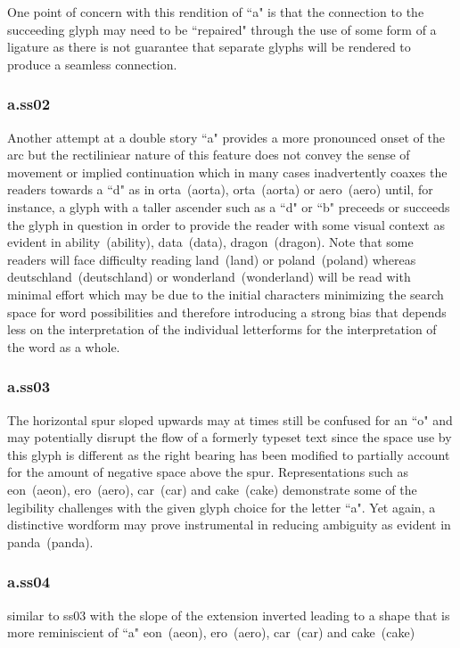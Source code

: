 One point of concern with this rendition of ``a" is that the connection to the
succeeding glyph may need to be ``repaired" through the use of some form of a
ligature as there is not guarantee that separate glyphs will be rendered to
produce a seamless connection.

\subsubsection{{\sstwo a}.ss02}

Another attempt at a double story ``a" provides a more pronounced onset of
the arc but the rectiliniear nature of this feature does not convey the sense
of movement or implied continuation which in many cases inadvertently coaxes
the readers towards a ``d" as in
\mbox{{orta} (aorta)},
\mbox{{ort{\sstwo a}} (aorta)} or
\mbox{{\sstwo aero} (aero)}
until, for instance, a glyph with a taller ascender such as a ``d" or ``b"
preceeds or succeeds the glyph in question in order to provide the reader with
some visual context as evident in
\mbox{{\sstwo ability} (ability)},
\mbox{{\sstwo data} (data)},
\mbox{{\sstwo dragon} (dragon)}. Note that some readers will face
difficulty reading \mbox{{\sstwo land} (land)} or
\mbox{{\sstwo poland} (poland)} whereas \mbox{{\sstwo deutschland} (deutschland)} or
\mbox{{\sstwo wonderland} (wonderland)}
will be read with minimal effort which may be due to the initial
characters minimizing the search space for word possibilities and therefore
introducing a strong bias that depends less on the interpretation of the
individual letterforms for the interpretation of the word as a whole.

\subsubsection{{\ssthree a}.ss03}
The horizontal spur sloped upwards may at times still be confused for an ``o"
and may potentially disrupt the flow of a formerly typeset text since
the space use by this glyph is different as the right bearing has been modified
to partially account for the amount of negative space above the spur.
Representations such as
\mbox{{eon} (aeon)},
\mbox{{ero} (aero)},
\mbox{{\ssdefault c{\ssthree a}r} (car)} and
\mbox{{\ssdefault c{\ssthree a}ke} (cake)}
demonstrate some of the legibility challenges with the given glyph choice for
the letter ``a". Yet again, a distinctive wordform may prove instrumental in
reducing ambiguity as evident in
\mbox{{\ssdefault p{\ssthree a}nda} (panda)}.

\subsubsection{{\ssfour a}.ss04}
similar to ss03 with the slope of the extension
inverted leading to a shape that is more reminiscient of ``a"
\mbox{{eon} (aeon)},
\mbox{{ero} (aero)},
\mbox{{\ssdefault c{\ssfour a}r} (car)} and
\mbox{{\ssdefault c{\ssthree a}ke} (cake)}
